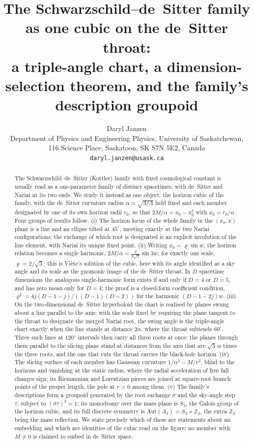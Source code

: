 \documentclass[11pt]{article}
\title{The Schwarzschild--de~Sitter family as one cubic on the de~Sitter throat:\\
\large a triple-angle chart, a dimension-selection theorem, and the family's description groupoid}
\author{Daryl Janzen\\
\small Department of Physics and Engineering Physics, University of Saskatchewan,\\
\small 116 Science Place, Saskatoon, SK S7N 5E2, Canada\\
\small \texttt{daryl.janzen@usask.ca}}
\date{}
\theoremstyle{plain}
\theoremstyle{definition}
\theoremstyle{remark}
\begin{document}
\maketitle

\begin{abstract}
The Schwarzschild--de~Sitter (Kottler) family with fixed cosmological constant is usually read as a
one-parameter family of distinct spacetimes, with de~Sitter and Nariai at its two ends. We study it instead as
one object: the horizon cubic of the family, with the de~Sitter curvature radius $\alpha=\sqrt{3/\Lambda}$ held
fixed and each member designated by one of its own horizon radii $r_0$, so that $2M/\alpha=x_0-x_0^{3}$ with
$x_0=r_0/\alpha$. Four groups of results follow. (i) The horizon locus of the whole family in the
$(x_0,x)$ plane is a line and an ellipse tilted at $45^{\circ}$, meeting exactly at the two Nariai
configurations; the exchange of which root is designated is an explicit involution of the line element, with
Nariai its unique fixed point. (ii) Writing $x_0=\varrho\sin w$, the horizon relation becomes a single
harmonic, $2M/\alpha=\tfrac{2}{3\sqrt3}\sin 3w$, for exactly one scale, $\varrho=2/\sqrt3$; this is Vi\`ete's
solution of the cubic, here with its angle identified as a sky angle and its scale as the gnomonic image of the
de~Sitter throat. In $D$ spacetime dimensions the analogous single-harmonic form exists if and only if $D=4$ or
$D=5$, and has zero mean only for $D=4$; the proof is a closed-form coefficient condition,
$\varrho^{2}=4j(D-1-j)/((D-1)(D-2))$ for the harmonic $(D-1-2j)w$. (iii) On the two-dimensional de~Sitter hyperboloid the chart is realised by planes swung about a
line parallel to the axis: with the scale fixed by requiring the plane tangent to the throat to designate the
merged Nariai root, the swing angle is the triple-angle chart exactly when the line stands at distance
$2\alpha$, where the throat subtends $60^{\circ}$. Three such lines at $120^{\circ}$ intervals then carry all three
roots at once: the planes through them parallel to the slicing plane stand at distances from the axis that are
$\sqrt3\,\alpha$ times the three roots, and the one that cuts the throat carries the black-hole horizon. (iv) The slicing surface of each member has
Gaussian curvature $1/\alpha^{2}-M/r^{3}$, blind to the horizons and vanishing at the static radius, where the radial
acceleration of free fall changes sign; its Riemannian and Lorentzian pieces are joined at square-root branch
points of the proper length, the pole at $r=0$ among them. (v) The family's descriptions form a groupoid generated by the root exchange
$\sigma$ and the sky-angle step $\tau$, subject to $(\sigma\tau)^{2}=1$; its monodromy over the mass plane is
$S_{3}$, the Galois group of the horizon cubic, and its full discrete symmetry is $\mathrm{Aut}(A_{2})=S_{3}\times
\mathbb{Z}_{2}$, the extra $\mathbb{Z}_{2}$ being the mass reflection. We state precisely which of these are
statements about an embedding and which are identities of the cubic read on the figure; no member with $M\neq0$
is claimed to embed in de~Sitter space.
\end{abstract}
\end{document}
